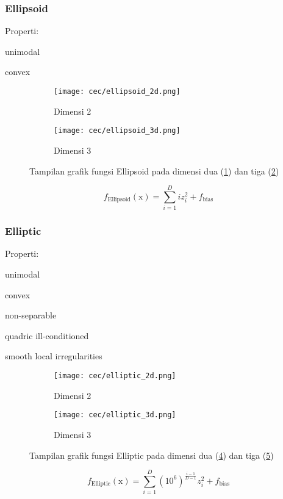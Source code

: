 \subsubsection*{Ellipsoid}
\noindent Properti:
\begin{packed_item}
  \item unimodal
  \item convex
\end{packed_item}
\begin{figure}[H]
	\centering
	\begin{subfigure}[b]{0.4\textwidth}
		\centering
		\texttt{[image: cec/ellipsoid\_2d.png]}
		\caption{Dimensi 2}
		\label{fig:ellipsoid-2d}
	\end{subfigure}
	\hfill
	\begin{subfigure}[b]{0.4\textwidth}
		\centering
		\texttt{[image: cec/ellipsoid\_3d.png]}
		\caption{Dimensi 3}
		\label{fig:ellipsoid-3d}
	\end{subfigure}
	\caption{Tampilan grafik fungsi Ellipsoid pada dimensi dua (\cref{fig:ellipsoid-2d}) dan tiga (\cref{fig:ellipsoid-3d})}
	\label{fig:ellipsoid}
\end{figure}
\begin{equation}
  f_{\text{Ellipsoid}}(\mathrm{x})=\sum_{i=1}^{D}iz_i^2  +f_{\text{bias}}
\end{equation}

\subsubsection*{Elliptic}
\noindent Properti:
\begin{packed_item}
  \item unimodal
  \item convex
  \item non-separable
  \item quadric ill-conditioned
  \item smooth local irregularities
\end{packed_item}
\begin{figure}[H]
	\centering
	\begin{subfigure}[b]{0.4\textwidth}
		\centering
		\texttt{[image: cec/elliptic\_2d.png]}
		\caption{Dimensi 2}
		\label{fig:elliptic-2d}
	\end{subfigure}
	\hfill
	\begin{subfigure}[b]{0.4\textwidth}
		\centering
		\texttt{[image: cec/elliptic\_3d.png]}
		\caption{Dimensi 3}
		\label{fig:elliptic-3d}
	\end{subfigure}
	\caption{Tampilan grafik fungsi Elliptic pada dimensi dua (\cref{fig:elliptic-2d}) dan tiga (\cref{fig:elliptic-3d})}
	\label{fig:elliptic}
\end{figure}
\begin{equation}
  f_{\text{Elliptic}}(\mathrm{x})= \sum_{i=1}^{D} \left( 10^6\right)^{\frac{i-1}{D-1}} z_i^2 +f_{\text{bias}}
\end{equation}

